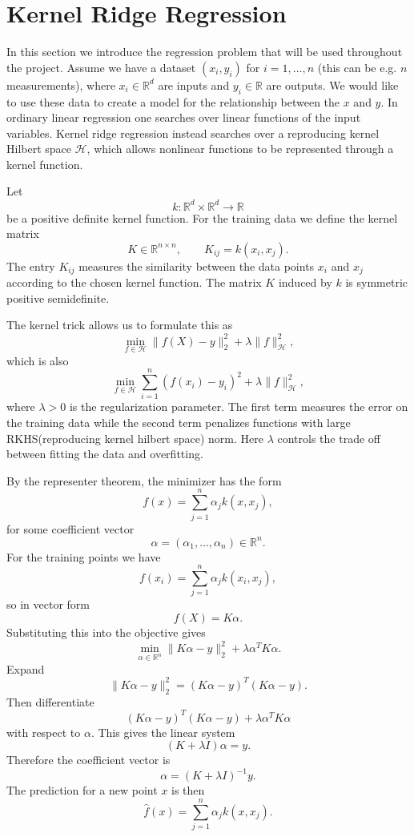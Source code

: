 \documentclass[11pt,a4paper]{article}
\begin{document}
\section{Kernel Ridge Regression}

In this section we introduce the regression problem that will be used throughout the project. Assume we have a dataset $(x_i,y_i)$ for $i=1,\dots,n$ (this can be e.g. $n$ measurements), where $x_i\in\mathbb{R}^d$ are inputs and $y_i\in\mathbb{R}$ are outputs. We would like to use these data to create a model for the relationship between the $x$ and $y$. In ordinary linear regression one searches over linear functions of the input variables. Kernel ridge regression instead searches over a reproducing kernel Hilbert space $\mathcal{H}$, which allows nonlinear functions to be represented through a kernel function.

Let
\[
k:\mathbb{R}^d \times \mathbb{R}^d \to \mathbb{R}
\]
be a positive definite kernel function. For the training data we define the kernel matrix
\[
K \in \mathbb{R}^{n \times n}, \qquad K_{ij} = k(x_i,x_j).
\]
The entry $K_{ij}$ measures the similarity between the data points $x_i$ and $x_j$ according to the chosen kernel function. The matrix $K$ induced by $k$ is symmetric positive semidefinite.

The kernel trick allows us to formulate this as
\[
\min_{f\in\mathcal H}\|f(X)-y\|_2^2+\lambda\|f\|_{\mathcal H}^2,
\]
which is also
\[
\min_{f\in\mathcal{H}}\sum_{i=1}^n (f(x_i)-y_i)^2+\lambda\|f\|_{\mathcal{H}}^2,
\]
where $\lambda > 0$ is the regularization parameter. The first term measures the error on the training data while the second term penalizes functions with large RKHS(reproducing kernel hilbert space) norm. Here $\lambda$ controls the trade off between fitting the data and overfitting.

By the representer theorem, the minimizer has the form
\[
f(x) = \sum_{j=1}^n \alpha_j k(x,x_j),
\]
for some coefficient vector
\[
\alpha = (\alpha_1,\ldots,\alpha_n) \in \mathbb{R}^n.
\]
For the training points we have
\[
f(x_i) = \sum_{j=1}^n \alpha_j k(x_i,x_j),
\]
so in vector form
\[
f(X) = K\alpha.
\]
Substituting this into the objective gives
\[
\min_{\alpha\in\mathbb R^n}\|K\alpha-y\|_2^2+\lambda\alpha^TK\alpha.
\]
Expand
\[
\|K\alpha-y\|_2^2=(K\alpha-y)^T(K\alpha-y).
\]
Then differentiate
\[
(K\alpha-y)^T(K\alpha-y)+\lambda\alpha^TK\alpha
\]
with respect to $\alpha$. This gives the linear system
\[
(K+\lambda I)\alpha=y.
\]
Therefore the coefficient vector is
\[
\alpha=(K+\lambda I)^{-1}y.
\]
The prediction for a new point $x$ is then
\[
\hat{f}(x)=\sum_{j=1}^n \alpha_j k(x,x_j).
\]
\end{document}

